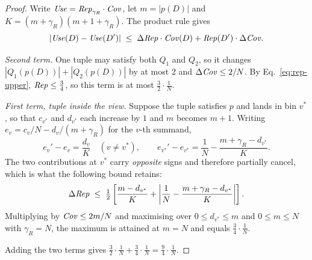 \begin{proof}
Write $\mathit{Use}=\mathit{Rep}_{\gamma_R}\cdot\mathit{Cov}$, let $m=|p(D)|$ and $K=(m+\gamma_R)(m+1+\gamma_R)$.
The product rule gives
\begin{equation}
|\mathit{Use}(D)-\mathit{Use}(D')| \;\le\; \Delta\mathit{Rep}\cdot\mathit{Cov}(D) + \mathit{Rep}(D')\cdot\Delta\mathit{Cov} .
\label{eq:usefulness-product-rule}
\end{equation}

\emph{Second term.} One tuple may satisfy both $Q_1$ and $Q_2$, so it changes $|Q_1(p(D))|+|Q_2(p(D))|$ by at most $2$ and $\Delta\mathit{Cov}\le 2/N$.
By Eq.~\eqref{eq:rep-upper}, $\mathit{Rep}\le\tfrac34$, so this term is at most $\tfrac32\cdot\tfrac1N$.

\emph{First term, tuple inside the view.} Suppose the tuple satisfies $p$ and lands in bin $v^*$, so that $c_{v^*}$ and $d_{v^*}$ each increase by $1$ and $m$ becomes $m+1$.
Writing $e_v=c_v/N-d_v/(m+\gamma_R)$ for the $v$-th summand,
\[
e_v'-e_v=\frac{d_v}{K}\quad(v\ne v^*),
\qquad
e_{v^*}'-e_{v^*}=\frac1N-\frac{m+\gamma_R-d_{v^*}}{K}.
\]
The two contributions at $v^*$ carry \emph{opposite} signs and therefore partially cancel, which is what the following bound retains:
\[
\Delta\mathit{Rep}\;\le\;\tfrac12\left[\frac{m-d_{v^*}}{K}+\left|\frac1N-\frac{m+\gamma_R-d_{v^*}}{K}\right|\right].
\]
Multiplying by $\mathit{Cov}\le 2m/N$ and maximising over $0\le d_{v^*}\le m$ and $0\le m\le N$ with $\gamma_R=N$, the maximum is attained at $m=N$ and equals $\tfrac34\cdot\tfrac1N$.

Adding the two terms gives $\tfrac32\cdot\tfrac1N+\tfrac34\cdot\tfrac1N=\tfrac94\cdot\tfrac1N$.


\end{proof}

